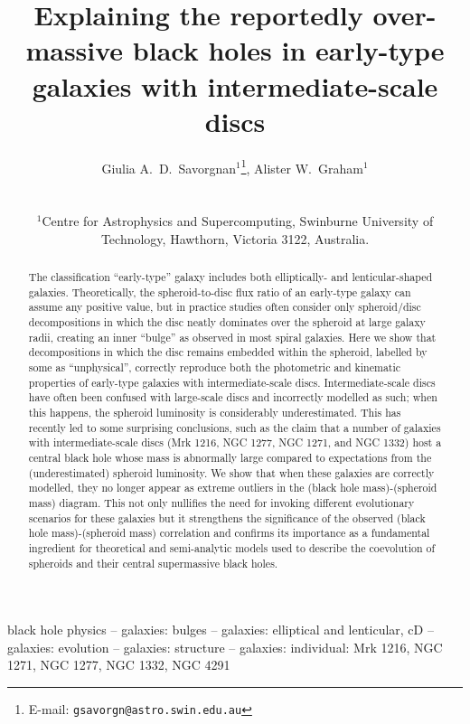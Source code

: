 \documentclass[useAMS,usenatbib,article]{mnras}
\title[Explaining the reportedly over-massive black holes]
{Explaining the reportedly over-massive black holes in early-type galaxies with intermediate-scale discs}
\author[G.~A.~D. Savorgnan \& A.~W. Graham]
{\parbox{\textwidth}{
Giulia A.~D.~Savorgnan$^{1}$\thanks{E-mail: \texttt{gsavorgn@astro.swin.edu.au}},
Alister W.~Graham$^{1}$}\vspace{0.4cm}\\
\parbox{\textwidth}{
$^{1}$Centre for Astrophysics and Supercomputing, Swinburne University of Technology, Hawthorn, Victoria 3122, Australia.\\}}
\begin{document}
\maketitle


\label{firstpage}


\begin{abstract}
The classification ``early-type'' galaxy includes both elliptically- and lenticular-shaped galaxies. 
Theoretically, the spheroid-to-disc flux ratio of an early-type galaxy can assume any positive value,  
but in practice studies often consider only spheroid/disc decompositions 
in which the disc neatly dominates over the spheroid at large galaxy radii, 
creating an inner ``bulge'' as observed in most spiral galaxies. 
Here we show that decompositions in which the disc remains embedded within the spheroid, 
labelled by some as ``unphysical'',  
correctly reproduce both the photometric and kinematic properties of early-type galaxies 
with intermediate-scale discs. 
Intermediate-scale discs have often been confused with large-scale discs and incorrectly modelled as such; 
when this happens, the spheroid luminosity is considerably underestimated. 
This has recently led to some surprising conclusions, 
such as the claim that a number of galaxies with intermediate-scale discs (Mrk 1216, NGC 1277, NGC 1271, and NGC 1332) 
host a central black hole whose mass is abnormally large compared to expectations from the (underestimated) spheroid luminosity. 
We show that when these galaxies are correctly modelled, 
they no longer appear as extreme outliers in the (black hole mass)-(spheroid mass) diagram. 
This not only nullifies the need for invoking different evolutionary scenarios for these galaxies 
but it strengthens the significance of the observed (black hole mass)-(spheroid mass) correlation 
and confirms its importance as a fundamental ingredient for theoretical and semi-analytic models 
used to describe the coevolution of spheroids and their central supermassive black holes. 

\end{abstract}

\begin{keywords}
black hole physics -- galaxies: bulges -- galaxies: elliptical and lenticular, cD -- 
galaxies: evolution -- galaxies: structure -- galaxies: individual: Mrk 1216, NGC 1271, NGC 1277, NGC 1332, NGC 4291
\end{keywords}
\end{document}
